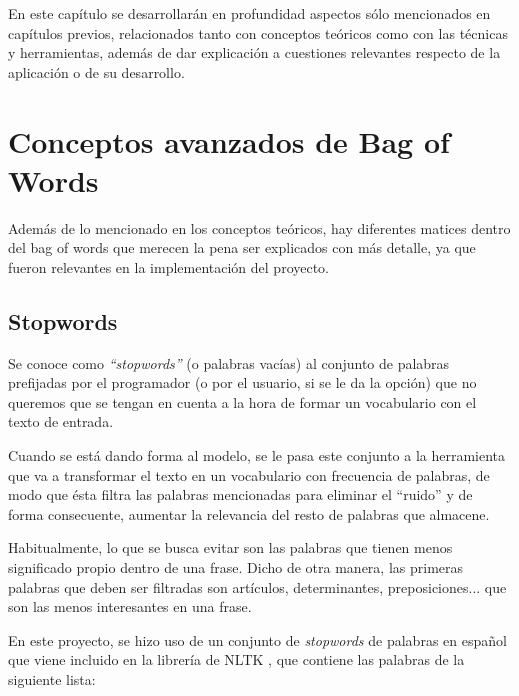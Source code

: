 
En este capítulo se desarrollarán en profundidad aspectos sólo mencionados en capítulos previos, relacionados tanto con conceptos teóricos como con las técnicas y herramientas, además de dar explicación a cuestiones relevantes respecto de la aplicación o de su desarrollo.

\section{Conceptos avanzados de Bag of Words}

Además de lo mencionado en los conceptos teóricos, hay diferentes matices dentro del bag of words que merecen la pena ser explicados con más detalle, ya que fueron relevantes en la implementación del proyecto.

\subsection{Stopwords}

Se conoce como \emph{``stopwords''} (o palabras vacías) al conjunto de palabras prefijadas por el programador (o por el usuario, si se le da la opción) que no queremos que se tengan en cuenta a la hora de formar un vocabulario con el texto de entrada. 

Cuando se está dando forma al modelo, se le pasa este conjunto a la herramienta que va a transformar el texto en un vocabulario con frecuencia de palabras, de modo que ésta filtra las palabras mencionadas para eliminar el ``ruido'' y de forma consecuente, aumentar la relevancia del resto de palabras que almacene.

Habitualmente, lo que se busca evitar son las palabras que tienen menos significado propio dentro de una frase. Dicho de otra manera, las primeras palabras que deben ser filtradas son artículos, determinantes, preposiciones... que son las menos interesantes en una frase.

En este proyecto, se hizo uso de un conjunto de \emph{stopwords} de palabras en español que viene incluido en la librería de NLTK \cite{nltk}, que contiene las palabras de la siguiente lista:

